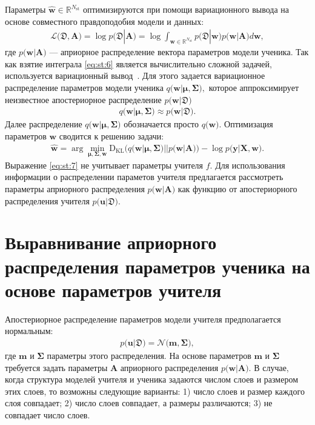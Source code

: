 Параметры $\hat{\mathbf{w}} \in \mathbb{R}^{N_{\text{st}}}$ оптимизируются при помощи вариационного вывода на основе совместного правдоподобия модели и данных:
\[
\label{eq:st:6}
\begin{aligned}
\mathcal{L}\bigr(\mathfrak{D}, \mathbf{A}\bigr) = \log p\bigr(\mathfrak{D}|\mathbf{A}\bigr) = \log \int_{\mathbf{w} \in \mathbb{R}^{N_{\text{st}}}}p\bigr(\mathfrak{D}|\mathbf{w}\bigr)p\bigr(\mathbf{w}|\mathbf{A}\bigr)d\mathbf{w},
\end{aligned}
\]
где $p\bigr(\mathbf{w}| \mathbf{A}\bigr)$ --- априорное распределение вектора параметров модели ученика.
Так как взятие интеграла \eqref{eq:st:6} является вычислительно сложной задачей, используется вариационный вывод~\cite{graves2011, grabovoy2019}. Для этого задается вариационное распределение параметров модели ученика $q\bigr(\mathbf{w}|\bm{\mu}, \bm{\Sigma}\bigr),$ которое аппроксимирует неизвестное апостериорное распределение $p\bigr(\mathbf{w}|\mathfrak{D}\bigr)$
\[
\label{eq:st:new:1}
\begin{aligned}
q\bigr(\mathbf{w}|\bm{\mu}, \bm{\Sigma}\bigr) \approx  p\bigr(\mathbf{w}|\mathfrak{D}\bigr).
\end{aligned}
\]
Далее распределение $q\bigr(\mathbf{w}|\bm{\mu}, \bm{\Sigma}\bigr)$ обозначается просто $q\bigr(\mathbf{w}\bigr).$ Оптимизация параметров $\mathbf{w}$ сводится к решению  задачи:
\[
\label{eq:st:7}
\begin{aligned}
\hat{\mathbf{w}} = \arg \min_{\bm{\mu}, \bm{\Sigma}, \mathbf{w}} \text{D}_{\text{KL}}\bigr(q\bigr(\mathbf{w}|\bm{\mu}, \bm{\Sigma}\bigr)||p\bigr(\mathbf{w}|\mathbf{A}\bigr)\bigr) - \log p\bigr(\mathbf{y}|\mathbf{X}, \mathbf{w}\bigr).
\end{aligned}
\]
Выражение \eqref{eq:st:7} не учитывает параметры учителя $f$. Для использования информации о распределении параметов учителя предлагается рассмотреть параметры априорного распределения $p\bigr(\mathbf{w}|\mathbf{A}\bigr)$ как функцию от апостериорного распределения учителя $p\bigr(\mathbf{u}|\mathfrak{D}\bigr)$.

\section{Выравнивание априорного распределения параметров ученика на основе параметров учителя}
Апостериорное распределение параметров модели учителя предполагается нормальным:
\[
\label{eq:ap:1}
\begin{aligned}
p\bigr(\mathbf{u}|\mathfrak{D}\bigr) = \mathcal{N}\bigr(\mathbf{m}, \bm{\Sigma}\bigr),
\end{aligned}
\]
где $\mathbf{m}$ и $\bm{\Sigma}$ параметры этого распределения. На основе параметров $\mathbf{m}$ и $\bm{\Sigma}$ требуется задать параметры $\mathbf{A}$ априорного распределения $p\bigr(\mathbf{w}|\mathbf{A}\bigr).$
В случае, когда структура моделей учителя и ученика задаются числом слоев и размером этих слоев, то возможны следующие варианты: 1) число слоев и размер каждого слоя совпадает; 2) число слоев совпадает, а размеры различаются; 3) не совпадает число слоев.

